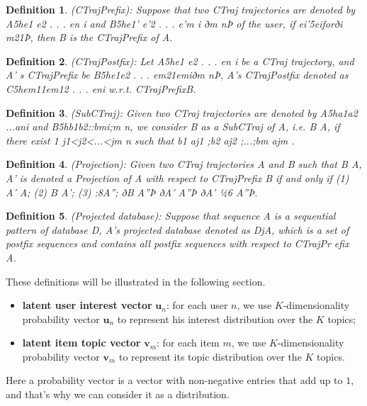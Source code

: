 \documentclass[conference]{IEEEtran}
\newtheorem{mydef}{Definition}
\begin{document}
\begin{mydef}
(CTrajPrefix): Suppose that two CTraj trajectories are denoted by A5he1 e2 . . . en i and B5he1' e'2 . . . e'm i ðm nÞ of the user, if ei'5eiforði m21Þ, then B is the CTrajPrefix of A.
\end{mydef}

\begin{mydef}
(CTrajPostfix): Let A5he1 e2 . . . en i be a CTraj trajectory, and A' s CTrajPrefix be B5he1e2 . . . em21emiðm nÞ, A's CTrajPostfix denoted as C5hem11em12 . . . eni w.r.t. CTrajPrefixB.
\end{mydef}

\begin{mydef}
(SubCTraj): Given two CTraj trajectories are denoted by A5ha1a2 ...ani and B5hb1b2::bmi;m n, we consider B as a SubCTraj of A, i.e. B   A, if there exist 1 j1<j2<...<jm n such that b1   aj1 ;b2   aj2 ;...;bm   ajm .
\end{mydef}

\begin{mydef}
(Projection): Given two CTraj trajectories A and B such that B   A, A' is denoted a Projection of A with respect to CTrajPrefix B if and only if (1) A'   A; (2) B   A'; (3) :8A''; ðB   A''Þ ðA'   A''Þ ðA' 1⁄46 A''Þ.
\end{mydef}

\begin{mydef}
(Projected database): Suppose that sequence A is a sequential pattern of database D, A's projected database denoted as DjA, which is a set of postfix sequences and contains all postfix sequences with respect to CTrajPr efix A.
\end{mydef}

These definitions will be illustrated in the following section.

   \begin{itemize}
     \item{{\bf latent user interest vector} $\bm{u}_n$}: for each user $n$, we use $K$-dimensionality probability vector $\bm{u}_n$ to represent his interest distribution over the $K$ topics;
     \item{{\bf latent item topic vector} $\bm{v}_m$}: for each item $m$, we use $K$-dimensionality probability vector $\bm{v}_m$ to represent its topic distribution over the $K$ topics.
   \end{itemize}
Here a probability vector is a vector with non-negative entries that add up to $1$, and that's why we can consider it as a distribution.
\end{document}
